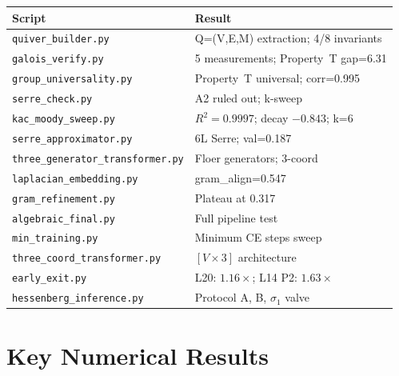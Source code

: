 \documentclass[11pt,a4paper]{article}
\begin{document}
\begin{center}
\small
\begin{tabular}{ll}
\toprule
Script & Result \\
\midrule
\texttt{quiver\_builder.py} & Q=(V,E,M) extraction; 4/8 invariants \\
\texttt{galois\_verify.py} & 5 measurements; Property~T gap=6.31 \\
\texttt{group\_universality.py} & Property~T universal; corr=0.995 \\
\texttt{serre\_check.py} & A2 ruled out; k-sweep \\
\texttt{kac\_moody\_sweep.py} & $R^2{=}0.9997$; decay $-0.843$; k=6 \\
\texttt{serre\_approximator.py} & 6L Serre; val=0.187 \\
\texttt{three\_generator\_transformer.py} & Floer generators; 3-coord \\
\texttt{laplacian\_embedding.py} & gram\_align=0.547 \\
\texttt{gram\_refinement.py} & Plateau at 0.317 \\
\texttt{algebraic\_final.py} & Full pipeline test \\
\texttt{min\_training.py} & Minimum CE steps sweep \\
\texttt{three\_coord\_transformer.py} & $[V{\times}3]$ architecture \\
\texttt{early\_exit.py} & L20: $1.16{\times}$; L14 P2: $1.63{\times}$ \\
\texttt{hessenberg\_inference.py} & Protocol A, B, $\sigma_1$ valve \\
\bottomrule
\end{tabular}
\end{center}

\section{Key Numerical Results}
\end{document}
